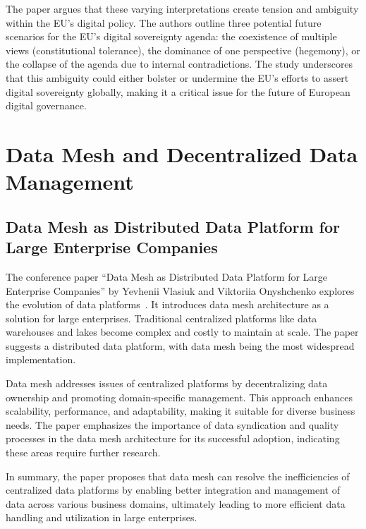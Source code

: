 The paper argues that these varying interpretations create tension and ambiguity within the EU's digital policy.
The authors outline three potential future scenarios for the EU's digital sovereignty agenda: the coexistence of multiple views (constitutional tolerance), the dominance of one perspective (hegemony), or the collapse of the agenda due to internal contradictions.
The study underscores that this ambiguity could either bolster or undermine the EU's efforts to assert digital sovereignty globally, making it a critical issue for the future of European digital governance.

\section{Data Mesh and Decentralized Data Management}\label{sec:data-mesh-and-decentralized-data-management}

\subsection[Data Mesh as Distributed Data Platform for Enterprises]{Data Mesh as Distributed Data Platform for Large Enterprise Companies}\label{subsec:data-mesh-as-distributed-data-platform-for-large-enterprise-companies}

The conference paper ``Data Mesh as Distributed Data Platform for Large Enterprise Companies'' by Yevhenii Vlasiuk and Viktoriia Onyshchenko explores the evolution of data platforms~\cite{data_mesh}.
It introduces data mesh architecture as a solution for large enterprises.
Traditional centralized platforms like data warehouses and lakes become complex and costly to maintain at scale.
The paper suggests a distributed data platform, with data mesh being the most widespread implementation.

Data mesh addresses issues of centralized platforms by decentralizing data ownership and promoting domain-specific management.
This approach enhances scalability, performance, and adaptability, making it suitable for diverse business needs.
The paper emphasizes the importance of data syndication and quality processes in the data mesh architecture for its successful adoption, indicating these areas require further research.

In summary, the paper proposes that data mesh can resolve the inefficiencies of centralized data platforms by enabling better integration and management of data across various business domains, ultimately leading to more efficient data handling and utilization in large enterprises.


